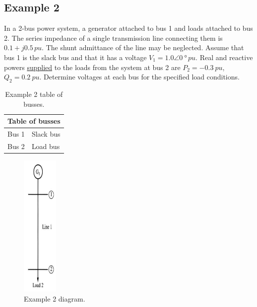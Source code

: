 \subsection{Example 2}
In a 2-bus power system, a generator attached to bus 1 and loads attached to bus 2. The series impedance of a single transmission line connecting them is $0.1 +j0.5\, \si{pu}$. The shunt admittance of the line may be neglected. Assume that bus 1 is the slack bus and that it has a voltage $V_1 = 1.0\angle\SI{0}{\degree}\,\si{pu}$. Real and reactive powers \underline{supplied} to the loads from the system at bus 2 are $P_2 = \SI{-0.3}{pu}$, $Q_2 = \SI{0.2}{pu}$. Determine voltages at each bus for the specified load conditions.
\begin{table}[H]
	\centering
	\begin{tabular}{@{}ll@{}}
		\toprule
		\multicolumn{2}{l}{\textbf{Table of busses}} \\
		\midrule
		Bus 1 & Slack bus                            \\
		Bus 2 & Load bus                             \\
		\bottomrule
	\end{tabular}
	\caption{Example 2 table of busses.}
\end{table}
\begin{figure}[H]
	\centering
	\includegraphics[height = 7cm]{img/figure51.png}
	\caption{Example 2 diagram.}
\end{figure}

